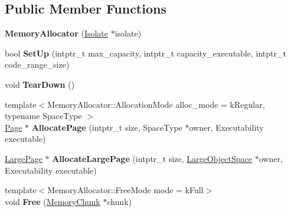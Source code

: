 \subsection*{Public Member Functions}
\begin{DoxyCompactItemize}
\item 
{\bfseries Memory\+Allocator} (\hyperlink{classv8_1_1internal_1_1_isolate}{Isolate} $\ast$isolate)\hypertarget{classv8_1_1internal_1_1_memory_allocator_aac1c43eb76882f367bced94543164335}{}\label{classv8_1_1internal_1_1_memory_allocator_aac1c43eb76882f367bced94543164335}

\item 
bool {\bfseries Set\+Up} (intptr\+\_\+t max\+\_\+capacity, intptr\+\_\+t capacity\+\_\+executable, intptr\+\_\+t code\+\_\+range\+\_\+size)\hypertarget{classv8_1_1internal_1_1_memory_allocator_aa277df0a26477b6c3df9c98511685c06}{}\label{classv8_1_1internal_1_1_memory_allocator_aa277df0a26477b6c3df9c98511685c06}

\item 
void {\bfseries Tear\+Down} ()\hypertarget{classv8_1_1internal_1_1_memory_allocator_a41d0347f476400e5b35fb9f40081471c}{}\label{classv8_1_1internal_1_1_memory_allocator_a41d0347f476400e5b35fb9f40081471c}

\item 
{\footnotesize template$<$Memory\+Allocator\+::\+Allocation\+Mode alloc\+\_\+mode = k\+Regular, typename Space\+Type $>$ }\\\hyperlink{classv8_1_1internal_1_1_page}{Page} $\ast$ {\bfseries Allocate\+Page} (intptr\+\_\+t size, Space\+Type $\ast$owner, Executability executable)\hypertarget{classv8_1_1internal_1_1_memory_allocator_a9d9fca1cde644395a1dfe2697d87173e}{}\label{classv8_1_1internal_1_1_memory_allocator_a9d9fca1cde644395a1dfe2697d87173e}

\item 
\hyperlink{classv8_1_1internal_1_1_large_page}{Large\+Page} $\ast$ {\bfseries Allocate\+Large\+Page} (intptr\+\_\+t size, \hyperlink{classv8_1_1internal_1_1_large_object_space}{Large\+Object\+Space} $\ast$owner, Executability executable)\hypertarget{classv8_1_1internal_1_1_memory_allocator_a38e856602b8fbe0ba032c5cc57bd0f72}{}\label{classv8_1_1internal_1_1_memory_allocator_a38e856602b8fbe0ba032c5cc57bd0f72}

\item 
{\footnotesize template$<$Memory\+Allocator\+::\+Free\+Mode mode = k\+Full$>$ }\\void {\bfseries Free} (\hyperlink{classv8_1_1internal_1_1_memory_chunk}{Memory\+Chunk} $\ast$chunk)\hypertarget{classv8_1_1internal_1_1_memory_allocator_a45142bb4bfeef4b6970fc23bdfa286a4}{}\label{classv8_1_1internal_1_1_memory_allocator_a45142bb4bfeef4b6970fc23bdfa286a4}


\end{DoxyCompactItemize}
